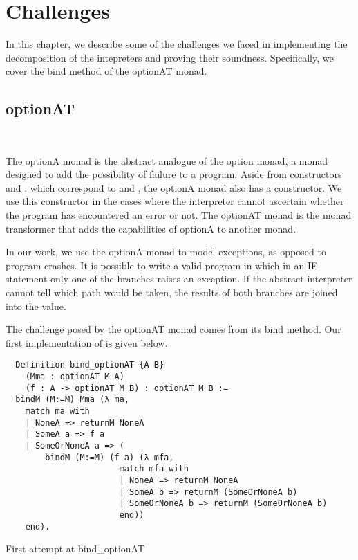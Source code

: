 \chapter{Challenges}

In this chapter, we describe some of the challenges we faced in implementing
the decomposition of the intepreters and proving their soundness. Specifically,
we cover the bind method of the optionAT monad.

\section{optionAT}~\label{sec:challenges-optionat}

The optionA monad is the abstract analogue of the option monad, a monad
designed to add the possibility of failure to a program. Aside from
constructors  and , which correspond to  and
, the optionA monad also has a  constructor.
We use this constructor in the cases where the interpreter cannot ascertain
whether the program has encountered an error or not. The optionAT monad is the
monad transformer that adds the capabilities of optionA to another monad.

In our work, we use the optionA monad to model exceptions, as opposed to
program crashes. It is possible to write a valid program in which in an
IF-statement only one of the branches raises an exception. If the abstract
interpreter cannot tell which path would be taken, the results of both branches
are joined into the  value.

The challenge posed by the optionAT monad comes from its bind method. Our
first implementation of  is given below.

\begin{listing}[H]
\begin{verbatim}
  Definition bind_optionAT {A B} 
    (Mma : optionAT M A)
    (f : A -> optionAT M B) : optionAT M B :=
  bindM (M:=M) Mma (λ ma,
    match ma with
    | NoneA => returnM NoneA
    | SomeA a => f a
    | SomeOrNoneA a => (
        bindM (M:=M) (f a) (λ mfa,
                       match mfa with
                       | NoneA => returnM NoneA
                       | SomeA b => returnM (SomeOrNoneA b)
                       | SomeOrNoneA b => returnM (SomeOrNoneA b)
                       end))
    end).
\end{verbatim}
\caption{First attempt at bind\_optionAT}
\label{lst:bind_optionAT}
\end{listing}

